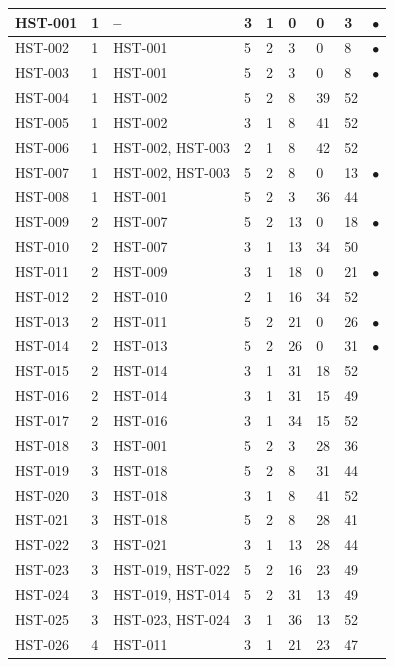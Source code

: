{\begin{longtable}{|M{1.9cm}|M{1.3cm}|M{1.6cm}|M{1.3cm}|M{1.7cm}|M{1.1cm}|M{1.7cm}|M{1.1cm}|M{1.0cm}|}
HST-001 & 1 & -- & 3 & 1 & 0 & 0 & 3 & $\bullet$ \\ \hline
HST-002 & 1 & HST-001 & 5 & 2 & 3 & 0 & 8 & $\bullet$ \\ \hline
HST-003 & 1 & HST-001 & 5 & 2 & 3 & 0 & 8 & $\bullet$ \\ \hline
HST-004 & 1 & HST-002 & 5 & 2 & 8 & 39 & 52 & \\ \hline
HST-005 & 1 & HST-002 & 3 & 1 & 8 & 41 & 52 & \\ \hline
HST-006 & 1 & HST-002, HST-003 & 2 & 1 & 8 & 42 & 52 & \\ \hline
HST-007 & 1 & HST-002, HST-003 & 5 & 2 & 8 & 0 & 13 & $\bullet$ \\ \hline
HST-008 & 1 & HST-001 & 5 & 2 & 3 & 36 & 44 & \\ \hline
HST-009 & 2 & HST-007 & 5 & 2 & 13 & 0 & 18 & $\bullet$ \\ \hline
HST-010 & 2 & HST-007 & 3 & 1 & 13 & 34 & 50 & \\ \hline
HST-011 & 2 & HST-009 & 3 & 1 & 18 & 0 & 21 & $\bullet$ \\ \hline
HST-012 & 2 & HST-010 & 2 & 1 & 16 & 34 & 52 & \\ \hline
HST-013 & 2 & HST-011 & 5 & 2 & 21 & 0 & 26 & $\bullet$ \\ \hline
HST-014 & 2 & HST-013 & 5 & 2 & 26 & 0 & 31 & $\bullet$ \\ \hline
HST-015 & 2 & HST-014 & 3 & 1 & 31 & 18 & 52 & \\ \hline
HST-016 & 2 & HST-014 & 3 & 1 & 31 & 15 & 49 & \\ \hline
HST-017 & 2 & HST-016 & 3 & 1 & 34 & 15 & 52 & \\ \hline
HST-018 & 3 & HST-001 & 5 & 2 & 3 & 28 & 36 & \\ \hline
HST-019 & 3 & HST-018 & 5 & 2 & 8 & 31 & 44 & \\ \hline
HST-020 & 3 & HST-018 & 3 & 1 & 8 & 41 & 52 & \\ \hline
HST-021 & 3 & HST-018 & 5 & 2 & 8 & 28 & 41 & \\ \hline
HST-022 & 3 & HST-021 & 3 & 1 & 13 & 28 & 44 & \\ \hline
HST-023 & 3 & HST-019, HST-022 & 5 & 2 & 16 & 23 & 49 & \\ \hline
HST-024 & 3 & HST-019, HST-014 & 5 & 2 & 31 & 13 & 49 & \\ \hline
HST-025 & 3 & HST-023, HST-024 & 3 & 1 & 36 & 13 & 52 & \\ \hline
HST-026 & 4 & HST-011 & 3 & 1 & 21 & 23 & 47 & \\ \hline

\end{longtable}}
